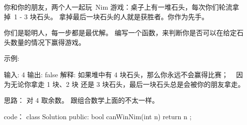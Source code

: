 你和你的朋友，两个人一起玩 Nim 游戏：桌子上有一堆石头，每次你们轮流拿掉 1 - 3 块石头。 拿掉最后一块石头的人就是获胜者。你作为先手。

你们是聪明人，每一步都是最优解。 编写一个函数，来判断你是否可以在给定石头数量的情况下赢得游戏。

示例:

输入: 4
输出: false 
解释: 如果堆中有 4 块石头，那么你永远不会赢得比赛；
     因为无论你拿走 1 块、2 块 还是 3 块石头，最后一块石头总是会被你的朋友拿走。


















思路：
对 4 取余数。
跟组合数学上面的不太一样。




















code：
class Solution {
public:
    bool canWinNim(int n) {
        return n %
    }
};
